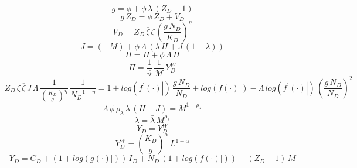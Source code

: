 \documentclass[10pt,a4paper]{article}
\begin{document}
\footnotesize
\begin{dmath}
{g}=\phi+\phi\, {\lambda}\, \left({Z_D}-1\right)
\end{dmath}
\begin{dmath}
{g}\, {Z_D}=\phi\, {Z_D}+{V_D}
\end{dmath}
\begin{dmath}
{V_D}={Z_D}\, {\overline{\zeta}}\, {\zeta}\, \left(\frac{{g}\, {N_D}}{{K_D}}\right)^{\eta}
\end{dmath}
\begin{dmath}
{J}=\left(-{M}\right)+\phi\, {\Lambda}\, \left({\lambda}\, {H}+{J}\, \left(1-{\lambda}\right)\right)
\end{dmath}
\begin{dmath}
{H}={\Pi}+\phi\, {\Lambda}\, {H}
\end{dmath}
\begin{dmath}
{\Pi}=\frac{1}{\vartheta}\, \frac{1}{{\mathcal{M}}}\, {Y^W_D}
\end{dmath}
\begin{dmath}
{Z_D}\, {\zeta}\, {\overline{\zeta}}\, {J}\, {\Lambda}\, \frac{1}{\left(\frac{{K_D}}{{g}}\right)^{\eta}}\, \frac{1}{{N_D}^{1-\eta}}=1+log\left({\left.       f^{\prime}\left( \cdot \right)   \right|}\right)\, \frac{{g}\, {N_D}}{{N_D}}+log\left({\left.       f\left( \cdot \right)            \right|}\right)-{\Lambda}\, log\left({\left.       f^{\prime}\left( \cdot \right)   \right|}\right)\, \left(\frac{{g}\, {N_D}}{{N_D}}\right)^{2}
\end{dmath}
\begin{dmath}
{\Lambda}\, \phi\, {\rho_\lambda}\, {\bar{\lambda}}\, \left({H}-{J}\right)={M}^{1-{\rho_\lambda}}
\end{dmath}
\begin{dmath}
{\lambda}={\bar{\lambda}}\, {M}^{{\rho_\lambda}}
\end{dmath}
\begin{dmath}
{Y_D}={Y^W_D}
\end{dmath}
\begin{dmath}
{Y^W_D}=\left(\frac{{K_D}}{{g}}\right)^{\alpha}\, {L}^{1-\alpha}
\end{dmath}
\begin{dmath}
{Y_D}={C_D}+\left(1+log\left({\left.       g\left( \cdot \right)            \right|}\right)\right)\, {I_D}+{N_D}\, \left(1+log\left({\left.       f\left( \cdot \right)            \right|}\right)\right)+\left({Z_D}-1\right)\, {M}
\end{dmath}
\end{document}
